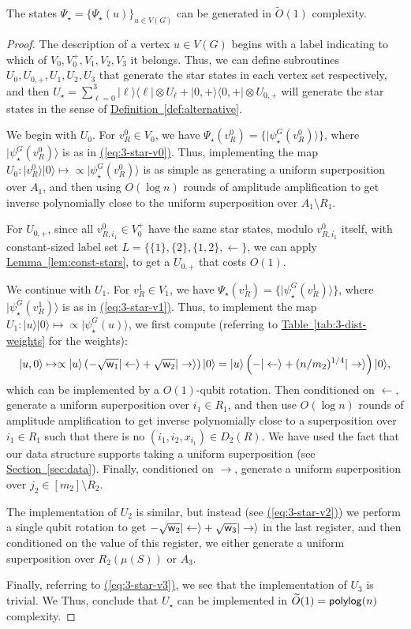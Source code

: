 \documentclass{theoretics}
\newcommand{\eq}[1]{\hyperref[eq:#1]{(\ref*{eq:#1})}}
\renewcommand{\sec}[1]{\hyperref[sec:#1]{Section~\ref*{sec:#1}}}
\newcommand{\lem}[1]{\hyperref[lem:#1]{Lemma~\ref*{lem:#1}}}
\newcommand{\tabl}[1]{\hyperref[tab:#1]{Table~\ref*{tab:#1}}}
\newcommand{\defin}[1]{\hyperref[def:#1]{Definition~\ref*{def:#1}}}
\def\ket#1{{\lvert}#1\rangle}
\def\bra#1{{\langle}#1\rvert}
\renewcommand{\>}{\rangle}
\newcommand{\<}{\langle}
\renewcommand{\(}{\left(}
\renewcommand{\)}{\right)}
\def\w{{\sf w}}
\begin{document}
\begin{lemma}\label{lem:3-dist-star-states}
The states $\Psi_\star=\{\Psi_\star(u)\}_{u\in V(G)}$ can be generated in $\widetilde{O}(1)$ complexity. 
\end{lemma}
\begin{proof}
The description of a vertex $u\in V(G)$ begins with a label indicating to which of $V_0,V_0^+,V_1,V_2,V_3$ it belongs. 
Thus, we can define subroutines $U_0,U_{0,+},U_1,U_2,U_3$ that generate the star states in each vertex set respectively,
and then $U_\star=\sum_{\ell = 0}^3\ket{\ell}\bra{\ell}\otimes U_{\ell} + \ket{0,+}\bra{0,+}\otimes U_{0,+}$ will generate the star states in the sense of \defin{alternative}. 

We begin with $U_0$. For $v^0_{R}\in V_0$, we have $\Psi_\star(v^0_R)=\{\ket{\psi_\star^G(v^0_R)}\}$, where $\ket{\psi_\star^G(v^0_R)}$ is as in \eq{3-star-v0}. Thus, implementing the map $U_0: \ket{v^0_R}\ket{0}\mapsto \propto \ket{\psi_\star^G(v^0_R)}$ is as simple as generating a uniform superposition over $A_1$, and then using $O(\log n)$ rounds of amplitude amplification to get inverse polynomially close to the uniform superposition over $A_1\setminus R_1$. 

For $U_{0,+}$, since all $v_{R,i_1}^0\in V_0^{+}$ have the same star states, modulo $v_{R,i_1}^0$ itself, with constant-sized label set $L=\{\{1\},\{2\},\{1,2\},\leftarrow\}$, we can apply \lem{const-stars}, to get a $U_{0,+}$ that costs $O(1)$. 

We continue with $U_1$. For $v^1_{R}\in V_1$, we have $\Psi_\star(v^1_R)=\{\ket{\psi_\star^G(v^1_R)}\}$, where $\ket{\psi_\star^G(v^1_R)}$ is as in \eq{3-star-v1}. Thus, to implement the map $U_1: \ket{u}\ket{0}\mapsto \propto \ket{\psi_\star^G(u)}$, we first compute (referring to \tabl{3-dist-weights} for the weights):
$$\ket{u,0}\mapsto\propto \ket{u}\left(-\sqrt{\w_1}\ket{\leftarrow}+\sqrt{\w_2}\ket{\rightarrow}\right)\ket{0}=\ket{u}\left(-\ket{\leftarrow}+(n/m_2)^{1/4}\ket{\rightarrow}\right)\ket{0},$$
which can be implemented by a $O(1)$-qubit rotation. Then conditioned on $\leftarrow$, generate a uniform superposition over $i_1\in R_1$, and then use $O(\log n)$ rounds of amplitude amplification to get inverse polynomially close to a superposition over $i_1\in R_1$ such that there is no $(i_1,i_2,x_{i_1})\in D_2(R)$. We have used the fact that our data structure supports taking a uniform superposition (see \sec{data}). Finally, conditioned on $\rightarrow$, generate a uniform superposition over $j_2\in [m_2]\setminus R_2$. 

The implementation of $U_2$ is similar, but instead (see \eq{3-star-v2}) we perform a single qubit rotation to get $-\sqrt{\w_2}\ket{\leftarrow}+\sqrt{\w_3}\ket{\rightarrow}$ in the last register, and then conditioned on the value of this register, we either generate a uniform superposition over $R_2(\mu(S))$ or $A_3$.

Finally, referring to \eq{3-star-v3}, we see that the implementation of $U_3$ is trivial.
We Thus, conclude that $U_\star$ can be implemented in $\widetilde{O}(1)={\sf polylog}(n)$ complexity.
\end{proof}
\end{document}
